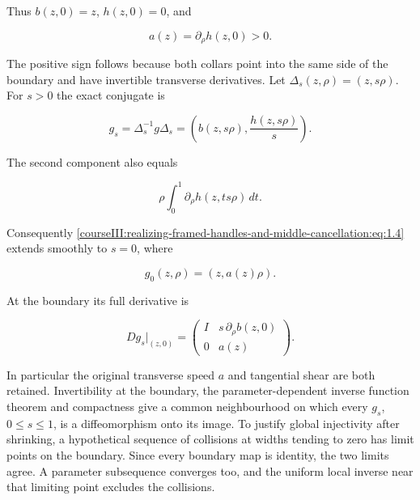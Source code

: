 Thus \(b(z,0)=z\), \(h(z,0)=0\), and

\begin{equation}
a(z)=\partial_\rho h(z,0)>0.
 \label{courseIII:realizing-framed-handles-and-middle-cancellation:eq:1.3}
\end{equation}

The positive sign follows because both collars point into the same side of the boundary and have invertible transverse derivatives. Let \(\Delta_s(z,\rho)=(z,s\rho)\). For \(s>0\) the exact conjugate is

\begin{equation}
g_s=\Delta_s^{-1}g\Delta_s
   =\left(b(z,s\rho),\frac{h(z,s\rho)}s\right).
 \label{courseIII:realizing-framed-handles-and-middle-cancellation:eq:1.4}
\end{equation}

The second component also equals

\begin{equation}
\rho\int_0^1\partial_\rho h(z,ts\rho)\,dt.
 \label{courseIII:realizing-framed-handles-and-middle-cancellation:eq:1.5}
\end{equation}

Consequently \eqref{courseIII:realizing-framed-handles-and-middle-cancellation:eq:1.4} extends smoothly to \(s=0\), where

\begin{equation}
g_0(z,\rho)=(z,a(z)\rho).
 \label{courseIII:realizing-framed-handles-and-middle-cancellation:eq:1.6}
\end{equation}

At the boundary its full derivative is

\begin{equation}
Dg_s|_{(z,0)}
 =\begin{pmatrix}
 I&s\,\partial_\rho b(z,0)\\
 0&a(z)
 \end{pmatrix}.
 \label{courseIII:realizing-framed-handles-and-middle-cancellation:eq:1.7}
\end{equation}

In particular the original transverse speed \(a\) and tangential shear are both retained. Invertibility at the boundary, the parameter-dependent inverse function theorem and compactness give a common neighbourhood on which every \(g_s\), \(0\leq s\leq1\), is a diffeomorphism onto its image. To justify global injectivity after shrinking, a hypothetical sequence of collisions at widths tending to zero has limit points on the boundary. Since every boundary map is identity, the two limits agree. A parameter subsequence converges too, and the uniform local inverse near that limiting point excludes the collisions.

